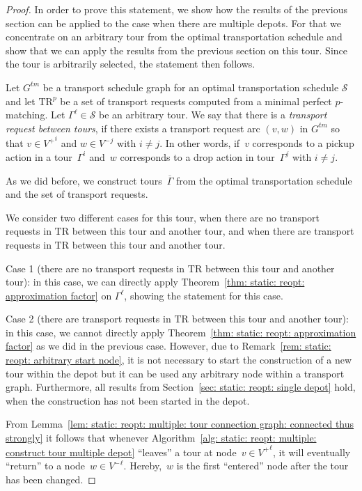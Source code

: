 \documentclass[english]{llncs}
\numberwithin{sublemma}{lemma}
\newcommand{\tourd}{\ensuremath{\Gamma}}
\newcommand{\sched}{\mathcal{S}}
\newcommand{\schedule}{\sched}
\newcommand{\TR}{\mathrm{TR}}
\newcommand{\Vpick}{{V^+}}
\newcommand{\Vdrop}{{V^-}}
\begin{document}
\begin{proof}
In order to prove this statement, we show how the results of the previous section can be applied to the case when there are multiple depots.
For that we concentrate on an arbitrary tour from the optimal transportation schedule and show that we can apply the results from the previous section on this tour.
Since the tour is arbitrarily selected, the statement then follows.


Let $G^{tm}$ be a transport schedule graph for an optimal transportation schedule $\schedule$ and let $\TR^p$ be a set of transport requests computed from a minimal perfect $p$-matching.
Let $\tourd^\ell \in \schedule$ be an arbitrary tour.
We say that there is a \emph{transport request between tours}, if there exists a transport request arc $(v, w)$ in $G^{tm}$ so that $v \in \Vpick^i$ and $w \in \Vdrop^j$ with $i \neq j$.
In other words, if~$v$ corresponds to a pickup action in a tour~$\tourd^i$ and~$w$ corresponds to a drop action in tour~$\tourd^j$ with $i \neq j$.

As we did before, we construct tours~$\overline{\tourd}$ from the optimal transportation schedule and the set of transport requests.

We consider two different cases for this tour, when there are no transport requests in $\TR$ between this tour and another tour,
and when there are transport requests in $\TR$ between this tour and another tour.


Case 1 (there are no transport requests in $\TR$ between this tour and another tour):
in this case, we can directly apply Theorem~\ref{thm: static: reopt: approximation factor} on $\tourd^\ell$, showing the statement for this case.

Case 2 (there are transport requests in $\TR$ between this tour and another tour):
in this case, we cannot directly apply Theorem~\ref{thm: static: reopt: approximation factor} as we did in the previous case. 
However, due to Remark~\ref{rem: static: reopt: arbitrary start node}, it is not necessary to start the construction of a new tour within the depot but it can be used any arbitrary node within a transport graph.
Furthermore, all results from Section~\ref{sec: static: reopt: single depot} hold, when the construction has not been started in the depot.

From Lemma~\ref{lem: static: reopt: multiple: tour connection graph: connected thus strongly} it follows that whenever Algorithm~\ref{alg: static: reopt: multiple: construct tour multiple depot}
``leaves'' a tour at node~$v \in \Vpick^\ell$, it will eventually ``return'' to a node~$w \in \Vdrop^\ell$.
Hereby,~$w$ is the first ``entered'' node after the tour has been changed.


\end{proof}
\end{document}
